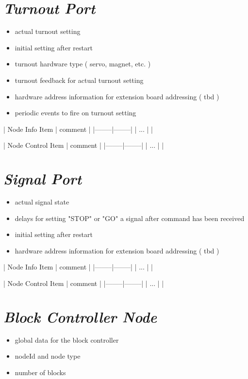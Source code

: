\section{\textit{Turnout Port}}
\begin{itemize}
\begin{itemize}
\item actual turnout setting
\item initial setting after restart
\item turnout hardware type ( servo, magnet, etc. )
\item turnout feedback for actual turnout setting
\item hardware address information for extension board addressing ( tbd )
\item periodic events to fire on turnout setting
\end{itemize}
\end{itemize}

| Node Info Item | comment |
|--------|--------|
| ... | |

| Node Control Item | comment |
|--------|--------|
| ... | |

\section{\textit{Signal Port}}
\begin{itemize}
\begin{itemize}
\item actual signal state
\item delays for setting "STOP" or "GO" a signal after command has been received
\item initial setting after restart
\item hardware address information for extension board addressing ( tbd )
\end{itemize}
\end{itemize}

| Node Info Item | comment |
|--------|--------|
| ... | |

| Node Control Item | comment |
|--------|--------|
| ... | |


\section{\textit{Block Controller Node}}
\begin{itemize}
\begin{itemize}
\item global data for the block controller
\item nodeId and node type
\item number of blocks
\end{itemize}
\end{itemize}

